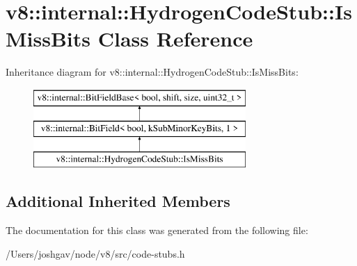 \hypertarget{classv8_1_1internal_1_1_hydrogen_code_stub_1_1_is_miss_bits}{}\section{v8\+:\+:internal\+:\+:Hydrogen\+Code\+Stub\+:\+:Is\+Miss\+Bits Class Reference}
\label{classv8_1_1internal_1_1_hydrogen_code_stub_1_1_is_miss_bits}
Inheritance diagram for v8\+:\+:internal\+:\+:Hydrogen\+Code\+Stub\+:\+:Is\+Miss\+Bits\+:\begin{figure}[H]
\begin{center}
\leavevmode
\includegraphics[height=3.000000cm]{classv8_1_1internal_1_1_hydrogen_code_stub_1_1_is_miss_bits}
\end{center}
\end{figure}
\subsection*{Additional Inherited Members}


The documentation for this class was generated from the following file\+:\begin{DoxyCompactItemize}
\item 
/\+Users/joshgav/node/v8/src/code-\/stubs.\+h\end{DoxyCompactItemize}
